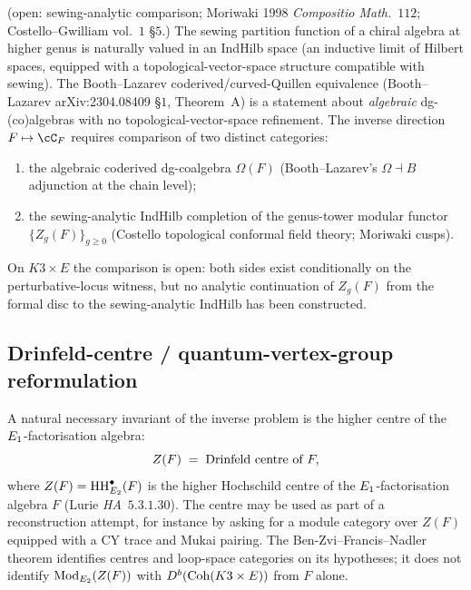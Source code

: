 \begin{theorem}
\label{thm:agent08-O3-sewing-indhilb}
\ClaimStatusConditional{} \textup{(open: sewing-analytic comparison;
Moriwaki 1998 \emph{Compositio Math.}~$112$; Costello--Gwilliam
\cite{CostelloGwilliam2017} vol.~$1$ \S$5$.)}
The sewing partition function of a chiral algebra at higher genus is
naturally valued in an IndHilb space (an inductive limit of Hilbert
spaces, equipped with a topological-vector-space structure compatible
with sewing). The Booth--Lazarev coderived/curved-Quillen equivalence
\textup{(}Booth--Lazarev arXiv:2304.08409 \S$1$, Theorem~A\textup{)} is
a statement about \emph{algebraic} dg-(co)algebras with no
topological-vector-space refinement. The inverse direction
$F\mapsto\cC_F$ requires comparison of two distinct categories:
\begin{enumerate}[label=\textup{(\alph*)}]
 \item the algebraic coderived dg-coalgebra
 $\Omega(F)$ \textup{(}Booth--Lazarev's
 $\Omega\dashv B$ adjunction at the chain level\textup{);}
 \item the sewing-analytic IndHilb completion of the genus-tower modular
 functor $\{Z_g(F)\}_{g\geq 0}$ \textup{(}Costello topological
 conformal field theory; Moriwaki cusps\textup{).}
\end{enumerate}
On $K3\times E$ the comparison is open: both sides exist conditionally
on the perturbative-locus witness, but no analytic continuation of
$Z_g(F)$ from the formal disc to the sewing-analytic IndHilb has been
constructed.
\end{theorem}

\subsection{Drinfeld-centre / quantum-vertex-group reformulation}
\label{wn:subsec:agent08-drinfeld-center}

\begin{construction}
\label{constr:agent08-mod-z}
\ClaimStatusConjectured{} A natural necessary invariant of the inverse
problem is the higher centre of the $E_1$-factorisation algebra:
\[
Z(F) \;=\;\textup{Drinfeld centre of }F,
\]
where $Z(F) = \mathrm{HH}^\bullet_{E_2}(F)$ is the higher Hochschild centre
of the $E_1$-factorisation algebra $F$
\textup{(}Lurie \emph{HA}~$5.3.1.30$\textup{).} The centre may be used
as part of a reconstruction attempt, for instance by asking for a
module category over $Z(F)$ equipped with a CY trace and Mukai pairing.
The Ben-Zvi--Francis--Nadler theorem identifies centres and loop-space
categories on its hypotheses; it does not identify
$\mathrm{Mod}_{E_2}(Z(F))$ with $D^b(\mathrm{Coh}(K3\times E))$ from $F$ alone.
\end{construction}

